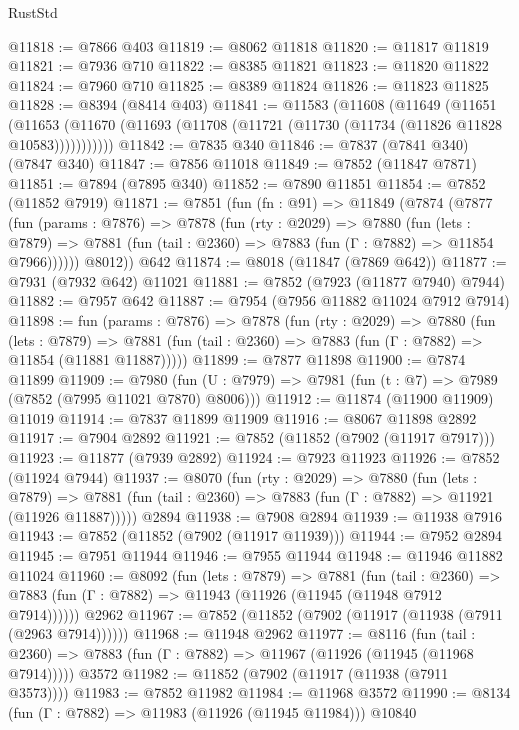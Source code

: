 \begin{lexlean}{RustStd}
\begin{coremodule}
@11818 := @7866 @403
@11819 := @8062 @11818
@11820 := @11817 @11819
@11821 := @7936 @710
@11822 := @8385 @11821
@11823 := @11820 @11822
@11824 := @7960 @710
@11825 := @8389 @11824
@11826 := @11823 @11825
@11828 := @8394 (@8414 @403)
@11841 := @11583
    (@11608
      (@11649
        (@11651
          (@11653 (@11670 (@11693 (@11708 (@11721 (@11730 (@11734 (@11826 @11828 @10583)))))))))))
@11842 := @7835 @340
@11846 := @7837 (@7841 @340) (@7847 @340)
@11847 := @7856 @11018
@11849 := @7852 (@11847 @7871)
@11851 := @7894 (@7895 @340)
@11852 := @7890 @11851
@11854 := @7852 (@11852 @7919)
@11871 := @7851
    (fun (fn : @91) =>
    @11849
      (@7874
        (@7877
          (fun (params : @7876) =>
          @7878
            (fun (rty : @2029) =>
            @7880
              (fun (lets : @7879) =>
              @7881 (fun (tail : @2360) => @7883 (fun (Γ : @7882) => @11854 @7966))))))
        @8012))
    @642
@11874 := @8018 (@11847 (@7869 @642))
@11877 := @7931 (@7932 @642) @11021
@11881 := @7852 (@7923 (@11877 @7940) @7944)
@11882 := @7957 @642
@11887 := @7954 (@7956 @11882 @11024 @7912 @7914)
@11898 := fun (params : @7876) =>
  @7878
    (fun (rty : @2029) =>
    @7880
      (fun (lets : @7879) =>
      @7881 (fun (tail : @2360) => @7883 (fun (Γ : @7882) => @11854 (@11881 @11887)))))
@11899 := @7877 @11898
@11900 := @7874 @11899
@11909 := @7980
    (fun (U : @7979) => @7981 (fun (t : @7) => @7989 (@7852 (@7995 @11021 @7870) @8006)))
@11912 := @11874 (@11900 @11909) @11019
@11914 := @7837 @11899 @11909
@11916 := @8067 @11898 @2892
@11917 := @7904 @2892
@11921 := @7852 (@11852 (@7902 (@11917 @7917)))
@11923 := @11877 (@7939 @2892)
@11924 := @7923 @11923
@11926 := @7852 (@11924 @7944)
@11937 := @8070
    (fun (rty : @2029) =>
    @7880
      (fun (lets : @7879) =>
      @7881 (fun (tail : @2360) => @7883 (fun (Γ : @7882) => @11921 (@11926 @11887)))))
    @2894
@11938 := @7908 @2894
@11939 := @11938 @7916
@11943 := @7852 (@11852 (@7902 (@11917 @11939)))
@11944 := @7952 @2894
@11945 := @7951 @11944
@11946 := @7955 @11944
@11948 := @11946 @11882 @11024
@11960 := @8092
    (fun (lets : @7879) =>
    @7881
      (fun (tail : @2360) =>
      @7883 (fun (Γ : @7882) => @11943 (@11926 (@11945 (@11948 @7912 @7914))))))
    @2962
@11967 := @7852 (@11852 (@7902 (@11917 (@11938 (@7911 (@2963 @7914))))))
@11968 := @11948 @2962
@11977 := @8116
    (fun (tail : @2360) => @7883 (fun (Γ : @7882) => @11967 (@11926 (@11945 (@11968 @7914)))))
    @3572
@11982 := @11852 (@7902 (@11917 (@11938 (@7911 @3573))))
@11983 := @7852 @11982
@11984 := @11968 @3572
@11990 := @8134 (fun (Γ : @7882) => @11983 (@11926 (@11945 @11984))) @10840

\end{coremodule}
\end{lexlean}
